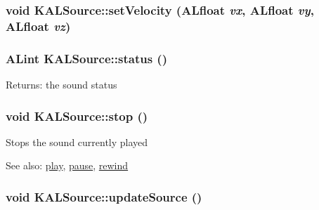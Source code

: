\hypertarget{class_k_a_l_source_911cddda3c690c5b85892003fe73dacd}{
\subsubsection[{setVelocity}]{\setlength{\rightskip}{0pt plus 5cm}void KALSource::setVelocity (ALfloat {\em vx}, \/  ALfloat {\em vy}, \/  ALfloat {\em vz})}}
\label{class_k_a_l_source_911cddda3c690c5b85892003fe73dacd}


\hypertarget{class_k_a_l_source_299fc8e2cf4d544dd19ac92322f44e28}{
\subsubsection[{status}]{\setlength{\rightskip}{0pt plus 5cm}ALint KALSource::status ()}}
\label{class_k_a_l_source_299fc8e2cf4d544dd19ac92322f44e28}


\begin{Desc}
\item[Returns:]the sound status \end{Desc}
\hypertarget{class_k_a_l_source_1796d7faf1bb7614111b3d7477c7c42b}{
\subsubsection[{stop}]{\setlength{\rightskip}{0pt plus 5cm}void KALSource::stop ()}}
\label{class_k_a_l_source_1796d7faf1bb7614111b3d7477c7c42b}


Stops the sound currently played \begin{Desc}
\item[See also:]\hyperlink{class_k_a_l_source_22573a4415c721d03693519b6ea0af96}{play}, \hyperlink{class_k_a_l_source_5073e178991fd50af8344a7e64491634}{pause}, \hyperlink{class_k_a_l_source_9c8b97bd784c3c362fd65276b9df03b4}{rewind} \end{Desc}
\hypertarget{class_k_a_l_source_fb27d2f3bc35c3f3b0ee84616091656c}{
\subsubsection[{updateSource}]{\setlength{\rightskip}{0pt plus 5cm}void KALSource::updateSource ()}}
\label{class_k_a_l_source_fb27d2f3bc35c3f3b0ee84616091656c}


